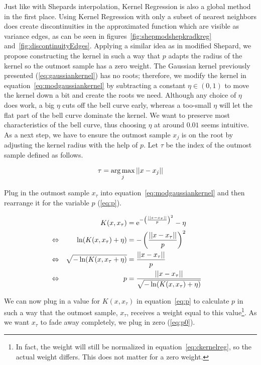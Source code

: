 Just like with Shepards interpolation, Kernel Regression is also a global method in the first place. Using Kernel Regression with only a subset of nearest neighbors does create discontinuities in the approximated function which are visible as variance edges, as can be seen in figures~\ref{fig:shepmodshepkradkreg} and~\ref{fig:discontinuityEdges}. Applying a similar idea as in modified Shepard, we propose constructing the kernel in such a way that $p$ adapts the radius of the kernel so the outmost sample has a zero weight. The Gaussian kernel previously presented (\ref{eq:gaussiankernel}) has no roots; therefore, we modify the kernel in equation~\ref{eq:modgaussiankernel} by subtracting a constant $\eta \in (0,1)$ to move the kernel down a bit and create the roots we need. %
Although any choice of $\eta$ does work, a big $\eta$ cuts off the bell curve early, whereas a too-small $\eta$ will let the flat part of the bell curve dominate the kernel. We want to preserve most characteristics of the bell curve, thus choosing $\eta$ at around $0.01$ seems intuitive.  As a next step, we have to ensure the outmost sample $x_j$ is on the root by adjusting the kernel radius with the help of $p$. Let $\tau$ be the index of the outmost sample defined as follows. 

\begin{align}
\label{eq:tau}
\tau = \operatorname*{arg\,max}_j ||x - x_j||
\end{align}

Plug in the outmost sample $x_\tau$ into equation~\ref{eq:modgaussiankernel} and then rearrange it for the variable $p$ (\ref{eq:p}). 

\begin{align}
&&K(x, x_\tau)&=\mathrm{e}^{-\left(\frac{||x-x_\tau||}{p}\right)^2} - \eta \label{eq:modgaussiankernel} &&\\
\Leftrightarrow&&\ln(K(x, x_\tau) + \eta) &= -\left(\frac{||x-x_\tau||}{p}\right)^2 \notag &&\\
\Leftrightarrow&& \sqrt{-\ln(K(x, x_\tau + \eta)} &= \frac{||x-x_\tau||}{p} \notag &&\\
\Leftrightarrow&& p &= \frac{||x-x_\tau||}{\sqrt{-\ln(K(x, x_\tau) + \eta)}} \label{eq:p}&&
\end{align}

We can now plug in a value for $K(x, x_\tau)$ in equation~\ref{eq:p} to calculate $p$ in such a way that the outmost sample, $x_\tau$, receives a weight equal to this value\footnote{In fact, the weight will still be normalized in equation~\ref{eq:ckernelreg}, so the actual weight differs. This does not matter for a zero weight.}. As we want $x_\tau$ to fade away completely, we plug in zero (\ref{eq:p0}).

